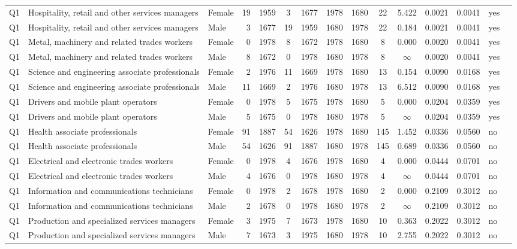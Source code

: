 \begin{longtable}{lllrcccccccccll}
Q1 & Hospitality, retail and other services managers & Female & 19 & 1959 & 3 & 1677 & 1978 & 1680 & 22 & 5.422 & 0.0021 & 0.0041 & yes \\
Q1 & Hospitality, retail and other services managers & Male & 3 & 1677 & 19 & 1959 & 1680 & 1978 & 22 & 0.184 & 0.0021 & 0.0041 & yes \\
Q1 & Metal, machinery and related trades workers & Female & 0 & 1978 & 8 & 1672 & 1978 & 1680 & 8 & 0.000 & 0.0020 & 0.0041 & yes \\
Q1 & Metal, machinery and related trades workers & Male & 8 & 1672 & 0 & 1978 & 1680 & 1978 & 8 & $\infty$ & 0.0020 & 0.0041 & yes \\
Q1 & Science and engineering associate professionals & Female & 2 & 1976 & 11 & 1669 & 1978 & 1680 & 13 & 0.154 & 0.0090 & 0.0168 & yes \\
Q1 & Science and engineering associate professionals & Male & 11 & 1669 & 2 & 1976 & 1680 & 1978 & 13 & 6.512 & 0.0090 & 0.0168 & yes \\
Q1 & Drivers and mobile plant operators & Female & 0 & 1978 & 5 & 1675 & 1978 & 1680 & 5 & 0.000 & 0.0204 & 0.0359 & yes \\
Q1 & Drivers and mobile plant operators & Male & 5 & 1675 & 0 & 1978 & 1680 & 1978 & 5 & $\infty$ & 0.0204 & 0.0359 & yes \\
Q1 & Health associate professionals & Female & 91 & 1887 & 54 & 1626 & 1978 & 1680 & 145 & 1.452 & 0.0336 & 0.0560 & no \\
Q1 & Health associate professionals & Male & 54 & 1626 & 91 & 1887 & 1680 & 1978 & 145 & 0.689 & 0.0336 & 0.0560 & no \\
Q1 & Electrical and electronic trades workers & Female & 0 & 1978 & 4 & 1676 & 1978 & 1680 & 4 & 0.000 & 0.0444 & 0.0701 & no \\
Q1 & Electrical and electronic trades workers & Male & 4 & 1676 & 0 & 1978 & 1680 & 1978 & 4 & $\infty$ & 0.0444 & 0.0701 & no \\
Q1 & Information and communications technicians & Female & 0 & 1978 & 2 & 1678 & 1978 & 1680 & 2 & 0.000 & 0.2109 & 0.3012 & no \\
Q1 & Information and communications technicians & Male & 2 & 1678 & 0 & 1978 & 1680 & 1978 & 2 & $\infty$ & 0.2109 & 0.3012 & no \\
Q1 & Production and specialized services managers & Female & 3 & 1975 & 7 & 1673 & 1978 & 1680 & 10 & 0.363 & 0.2022 & 0.3012 & no \\
Q1 & Production and specialized services managers & Male & 7 & 1673 & 3 & 1975 & 1680 & 1978 & 10 & 2.755 & 0.2022 & 0.3012 & no \\

\end{longtable}
